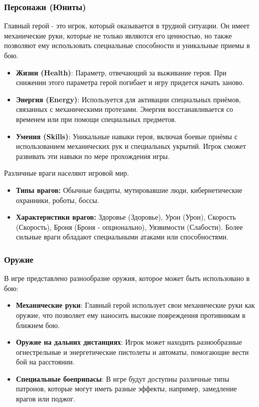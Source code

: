 \documentclass{article}
\begin{document}
\subsubsection{Персонажи (Юниты)}
Главный герой - это игрок, который оказывается в трудной ситуации. Он имеет механические руки, которые не только являются его ценностью, но также позволяют ему использовать специальные способности и уникальные приемы в бою.
\begin{itemize}
   \item \textbf{Жизни (Health)}: Параметр, отвечающий за выживание героя. При снижении этого параметра герой погибает и игру придется начать заново.
    \item \textbf{Энергия (Energy)}: Используется для активации специальных приёмов, связанных с механическими протезами. Энергия восстанавливается со временем или при помощи специальных предметов.
    \item \textbf{Умения (Skills)}: Уникальные навыки героя, включая боевые приёмы с использованием механических рук и специальных укрытий. Игрок сможет развивать эти навыки по мере прохождения игры.

\end{itemize}
Различные враги населяют игровой мир.

\begin{itemize} 
     \item \textbf{Типы врагов:} Обычные бандиты, мутировавшие люди, кибернетические охранники, роботы, боссы. 
     \item \textbf{Характеристики врагов:} Здоровье (Здоровье), Урон (Урон), Скорость (Скорость), Броня (Броня - опционально), Уязвимости (Слабости). Более сильные враги обладают специальными атаками или способностями.
\end{itemize}
\subsubsection{Оружие}
В игре представлено разнообразие оружия, которое может быть использовано в бою:
\begin{itemize}
    \item \textbf{Механические руки}: Главный герой использует свои механические руки как оружие, что позволяет ему наносить высокие повреждения противникам в ближнем бою.
    \item \textbf{Оружие на дальних дистанциях}: Игрок может находить разнообразные огнестрельные и энергетические пистолеты и автоматы, помогающие вести бой на расстоянии.
    \item \textbf{Специальные боеприпасы}: В игре будут доступны различные типы патронов, которые могут иметь разные эффекты, например, замедление врагов или поджог.
\end{itemize}
\end{document}
